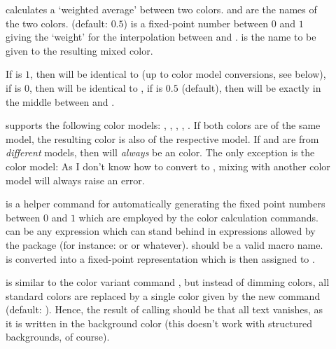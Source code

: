 \begin{slide}
\begin{description}
  \item[]
     calculates a
    `weighted average' between two colors.  and  are the names of the two colors. 
    (default: $0.5$) is a fixed-point number between $0$ and $1$ giving the `weight' for the interpolation between
     and .  is the name to be given to the resulting mixed color.

    If  is $1$, then  will be identical to  (up to color model conversions, see
    below), if  is $0$, then  will be identical to , if  is $0.5$
    (default), then  will be exactly in the middle between  and .

     supports the following color models: , , , ,
    . If both colors are of the same model, the resulting color is also of the respective model. If
     and  are from \emph{different} models, then  will \emph{always} be an 
    color. The only exception is the  color model: As I don't know how to convert  to ,
    mixing  with another color model will always raise an error.

    \newslide

  \item[]
     is a helper command for automatically
    generating the fixed point numbers between $0$ and $1$ which are employed by the color calculation commands.
     can be any expression which can stand behind \code{*} in expressions allowed by the
    \href{ftp://ftp.dante.de/tex-archive/help/Catalogue/entries/calc.html}{} package (for instance:
     or  or whatever).
     should be a valid macro name.  is converted into a fixed-point representation which is
    then assigned to .

    \newslide

  \item[]
     is similar to the color variant command
    , but instead of dimming colors, all standard colors are replaced by a single color given by
    the new command  (default: ). Hence, the result of calling
     should be that all text vanishes, as it is written in the background color (this doesn't
    work with structured backgrounds, of course).


\end{description}
\end{slide}
